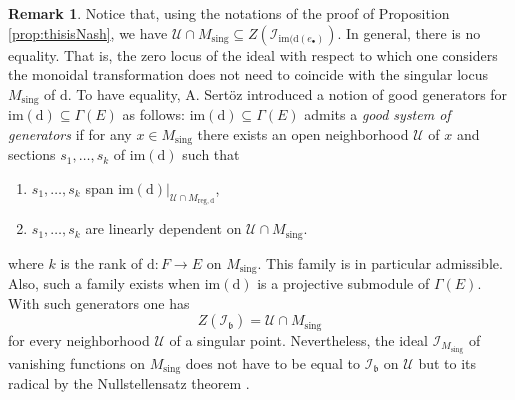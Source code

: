 \documentclass[10pt]{article}
\theoremstyle{plain}
\theoremstyle{definition}
\newtheorem{remark}[lemma]{Remark}
\theoremstyle{remark}
\newcommand{\dd}{\mathrm{d}}
\begin{document}
\begin{remark}
    Notice that, using the notations of the proof of Proposition \ref{prop:thisisNash}, we have $\mathcal{ U}\cap M_{\mathrm{ sing}}\subseteq Z(\mathcal{I}_{{\mathrm{im}}(\dd(e_\bullet)}) $. 
    In general, there is no equality. That is, the zero locus of the ideal with respect to which one considers the monoidal transformation does not need to coincide with the singular
locus $M_{\mathrm{sing}}$ of $\dd$. To have equality, A. Sertöz \cite{Ali-Sinan} introduced a notion of good generators for $\mathrm{im}(\dd)\subseteq \Gamma(E)$ as follows: $\mathrm{im}(\dd)\subseteq \Gamma(E)$  admits a \emph{good system of generators} if for any $x\in M_{\mathrm{sing}}$ there exists an open neighborhood $\mathcal{U}$  of $x$ and  sections  $s_1, \ldots, s_k$ of $\mathrm{im}(\dd)$ such that

\begin{enumerate}
    
    \item  $s_1, \ldots, s_k$ span $\mathrm{im}(\dd)|_{\mathcal{U}\cap M_{\mathrm{reg},\dd}}$,
\item $s_1, \ldots, s_k$ are linearly dependent on $\mathcal{U}\cap M_{\mathrm{sing}}$.

\end{enumerate}

where $k$ is the rank of $\dd\colon F\to E$ on $M_{\mathrm{sing}}$. This family is in particular admissible. Also, such a family exists  when $\mathrm{im}(\dd)$ is a projective submodule of $\Gamma(E)$.
With such generators one has $$Z(\mathcal{I}_\mathfrak b)=\mathcal{ U}\cap M_{\mathrm{ sing}}$$ for every neighborhood  $\mathcal{U}$ of a singular point. Nevertheless, the ideal $\mathcal{I}_{M_{\mathrm{sing}}}$ of vanishing functions on $M_{\mathrm{sing}}$ does not have to be equal to $\mathcal{I}_\mathfrak b$ on $\mathcal{U}$ but to its radical by the Nullstellensatz theorem \cite{zbMATH00704831}. 
%
%
%
%
%
\end{remark}
\end{document}
